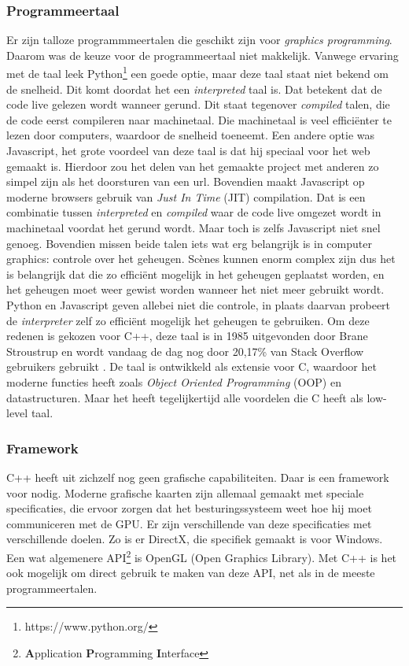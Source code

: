 \documentclass[12pt, a4paper]{article}
\begin{document}
\subsubsection{Programmeertaal}
Er zijn talloze programmmeertalen die geschikt zijn voor \textit{graphics programming}. Daarom was de keuze voor de programmeertaal niet makkelijk. Vanwege ervaring met de taal leek Python\footnote{https://www.python.org/} een goede optie, maar deze taal staat niet bekend om de snelheid. Dit komt doordat het een \emph{interpreted} taal is. Dat betekent dat de code live gelezen wordt wanneer gerund. Dit staat tegenover \emph{compiled} talen, die de code eerst compileren naar machinetaal. Die machinetaal is veel efficiënter te lezen door computers, waardoor de snelheid toeneemt. Een andere optie was Javascript, het grote voordeel van deze taal is dat hij speciaal voor het web gemaakt is. Hierdoor zou het delen van het gemaakte project met anderen zo simpel zijn als het doorsturen van een url. Bovendien maakt Javascript op moderne browsers gebruik van \textit{Just In Time} (JIT) compilation. Dat is een combinatie tussen \emph{interpreted} en \emph{compiled} waar de code live omgezet wordt in machinetaal voordat het gerund wordt. Maar toch is zelfs Javascript niet snel genoeg. Bovendien missen beide talen iets wat erg belangrijk is in computer graphics: controle over het geheugen. Scènes kunnen enorm complex zijn dus het is belangrijk dat die zo efficiënt mogelijk in het geheugen geplaatst worden, en het geheugen moet weer gewist worden wanneer het niet meer gebruikt wordt. Python en Javascript geven allebei niet die controle, in plaats daarvan probeert de \emph{interpreter} zelf zo efficiënt mogelijk het geheugen te gebruiken. Om deze redenen is gekozen voor C++, deze taal is in 1985 uitgevonden door Brane Stroustrup en wordt vandaag de dag nog door 20,17\% van Stack Overflow gebruikers gebruikt \cite{StackOverflowSurvey}. De taal is ontwikkeld als extensie voor C, waardoor het moderne functies heeft zoals \emph{Object Oriented Programming} (OOP) en datastructuren. Maar het heeft tegelijkertijd alle voordelen die C heeft als low-level taal. 
\subsubsection{Framework}
C++ heeft uit zichzelf nog geen grafische capabiliteiten. Daar is een framework voor nodig. Moderne grafische kaarten zijn allemaal gemaakt met speciale specificaties, die ervoor zorgen dat het besturingssysteem weet hoe hij moet communiceren met de GPU. Er zijn verschillende van deze specificaties met verschillende doelen. Zo is er DirectX, die specifiek gemaakt is voor Windows. Een wat algemenere API\footnote{\textbf{A}pplication \textbf{P}rogramming \textbf{I}nterface} is OpenGL (Open Graphics Library). Met C++ is het ook mogelijk om direct gebruik te maken van deze API, net als in de meeste programmeertalen. 
\end{document}

